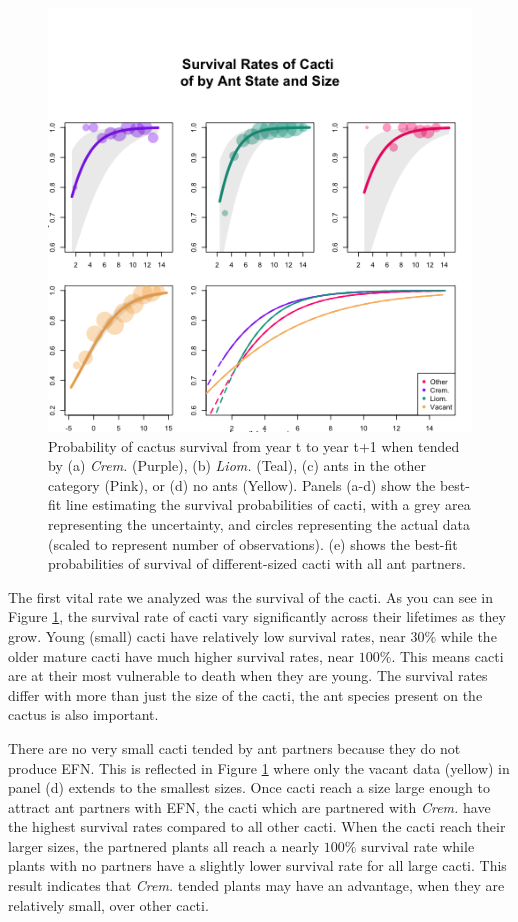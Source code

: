 \documentclass[12pt,a4paper]{article}
\begin{document}
\begin{figure}[!ht]
	\centering
	\includegraphics[width = 0.85\linewidth]{Figures/surv_panels_cropped.png}
	\caption{Probability of cactus survival from year t to year t+1 when tended by (a) \textit{Crem.} (Purple), (b) \textit{Liom.} (Teal), (c) ants in the other category (Pink), or (d) no ants (Yellow). Panels (a-d) show the best-fit line estimating the survival probabilities of cacti, with a grey area representing the uncertainty, and circles representing the actual data (scaled to represent number of observations). (e) shows the best-fit probabilities of survival of different-sized cacti with all ant partners.}
	\label{fig:surv}
\end{figure}

	The first vital rate we analyzed was the survival of the cacti. As you can see in Figure \ref{fig:surv}, the survival rate of cacti vary significantly across their lifetimes as they grow. Young (small) cacti have relatively low survival rates, near $30\%$ while the older mature cacti have much higher survival rates, near $100\%$. This means cacti are at their most vulnerable to death when they are young. The survival rates differ with more than just the size of the cacti, the ant species present on the cactus is also important. 

There are no very small cacti tended by ant partners because they do not produce EFN. This is reflected in Figure \ref{fig:surv} where only the vacant data (yellow) in panel (d) extends to the smallest sizes. Once cacti reach a size large enough to attract ant partners with EFN, the cacti which are partnered with \textit{Crem.} have the highest survival rates compared to all other cacti. When the cacti reach their larger sizes, the partnered plants all reach a nearly $100\%$ survival rate while plants with no partners have a slightly lower survival rate for all large cacti. This result indicates that \textit{Crem.} tended plants may have an advantage, when they are relatively small, over other cacti. 
\end{document}
